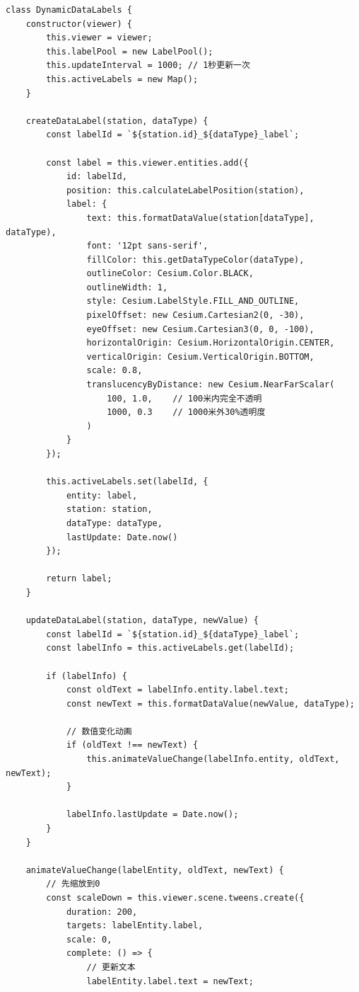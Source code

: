\begin{lstlisting}
class DynamicDataLabels {
    constructor(viewer) {
        this.viewer = viewer;
        this.labelPool = new LabelPool();
        this.updateInterval = 1000; // 1秒更新一次
        this.activeLabels = new Map();
    }
    
    createDataLabel(station, dataType) {
        const labelId = `${station.id}_${dataType}_label`;
        
        const label = this.viewer.entities.add({
            id: labelId,
            position: this.calculateLabelPosition(station),
            label: {
                text: this.formatDataValue(station[dataType], dataType),
                font: '12pt sans-serif',
                fillColor: this.getDataTypeColor(dataType),
                outlineColor: Cesium.Color.BLACK,
                outlineWidth: 1,
                style: Cesium.LabelStyle.FILL_AND_OUTLINE,
                pixelOffset: new Cesium.Cartesian2(0, -30),
                eyeOffset: new Cesium.Cartesian3(0, 0, -100),
                horizontalOrigin: Cesium.HorizontalOrigin.CENTER,
                verticalOrigin: Cesium.VerticalOrigin.BOTTOM,
                scale: 0.8,
                translucencyByDistance: new Cesium.NearFarScalar(
                    100, 1.0,    // 100米内完全不透明
                    1000, 0.3    // 1000米外30%透明度
                )
            }
        });
        
        this.activeLabels.set(labelId, {
            entity: label,
            station: station,
            dataType: dataType,
            lastUpdate: Date.now()
        });
        
        return label;
    }
    
    updateDataLabel(station, dataType, newValue) {
        const labelId = `${station.id}_${dataType}_label`;
        const labelInfo = this.activeLabels.get(labelId);
        
        if (labelInfo) {
            const oldText = labelInfo.entity.label.text;
            const newText = this.formatDataValue(newValue, dataType);
            
            // 数值变化动画
            if (oldText !== newText) {
                this.animateValueChange(labelInfo.entity, oldText, newText);
            }
            
            labelInfo.lastUpdate = Date.now();
        }
    }
    
    animateValueChange(labelEntity, oldText, newText) {
        // 先缩放到0
        const scaleDown = this.viewer.scene.tweens.create({
            duration: 200,
            targets: labelEntity.label,
            scale: 0,
            complete: () => {
                // 更新文本
                labelEntity.label.text = newText;
                

\end{lstlisting}
